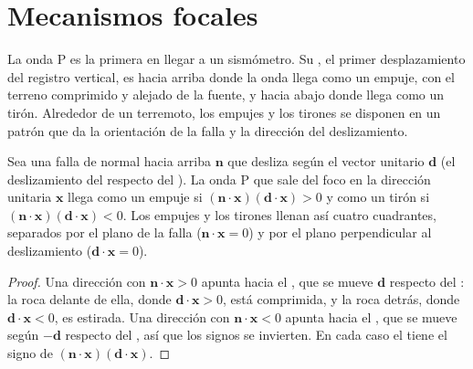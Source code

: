 \section{Mecanismos focales}\label{sec:b1:earthquake-source:focal}

La onda P es la primera en llegar a un sismómetro. Su , el primer desplazamiento del registro vertical, es hacia
arriba donde la onda llega como un empuje, con el terreno comprimido y alejado de la fuente, y hacia abajo donde llega como un tirón.
Alrededor de un terremoto, los empujes y los tirones se disponen en un patrón que da la orientación de la falla y la dirección del
deslizamiento.

\begin{proposition}\label{prop:b1:earthquake-source:first-motion}
Sea una falla de normal hacia arriba $\mathbf n$ que desliza según el vector unitario $\mathbf d$ (el deslizamiento del  respecto del ). La onda P que sale del foco en la dirección unitaria $\mathbf x$ llega como un empuje si
$(\mathbf n\cdot\mathbf x)(\mathbf d\cdot\mathbf x) > 0$ y como un tirón si
$(\mathbf n\cdot\mathbf x)(\mathbf d\cdot\mathbf x) < 0$. Los empujes y los
tirones llenan así cuatro cuadrantes, separados por el plano de la falla
($\mathbf n\cdot\mathbf x = 0$) y por el plano perpendicular al deslizamiento
($\mathbf d\cdot\mathbf x = 0$).
\end{proposition}

\begin{proof}
Una dirección con $\mathbf n\cdot\mathbf x > 0$ apunta hacia el , que se mueve $\mathbf d$ respecto del :
la roca delante de ella, donde $\mathbf d\cdot\mathbf x > 0$, está comprimida, y la roca detrás, donde $\mathbf d\cdot\mathbf x < 0$, es
estirada. Una dirección con $\mathbf n\cdot\mathbf x < 0$ apunta hacia el , que se mueve según
$-\mathbf d$ respecto del , así que los signos se invierten. En cada caso el  tiene el signo de $(\mathbf n\cdot\mathbf x)(\mathbf
d\cdot\mathbf x)$.
\end{proof}

